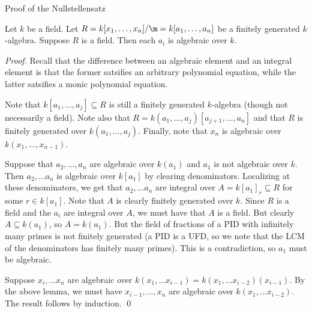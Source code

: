 Proof of the Nullstellensatz

\begin{theorem}
    Let $k$ be a field. Let $R=k[x_1, \dots, x_n]/\m = k[a_1, \dots, a_n]$ be a finitely
    generated $k$-algebra. Suppose $R$ is a
    field. Then each $a_i$ is algebraic over $k$.
\end{theorem}
\begin{proof}
    Recall that the difference between an algebraic element and an integral element
    is that the former satsifies an arbitrary polynomial equation, while the latter
    satsifies a monic polynomial equation.

    Note that $k[a_1, \dots, a_j] \subseteq R$ is still a finitely generated
    $k$-algebra (though not necessarily a field). Note also that
    $R=k(a_1, \dots, a_j)[a_{j+1}, \dots, a_n]$ and that $R$ is finitely generated
    over $k(a_1, \dots, a_j)$. Finally, note that $x_n$ is
    algebraic over $k(x_1, \dots, x_{n-1})$.

    Suppose that $a_2, \dots, a_n$ are algebraic over $k(a_1)$
    and $a_1$ is not algebraic over $k$. Then
    $a_2, \dots a_n$ is algebraic over $k[a_1]$ by clearing
    denominators. Localizing at these denominators, we get that
    $a_2,\dots a_n$ are integral over $A=k[a_1]_r \subseteq R$ for some
    $r \in k[a_1]$. Note that $A$ is clearly finitely
    generated over $k$. Since $R$ is a field
    and the $a_i$ are integral over $A$, we
    must have that $A$ is a field. But clearly
    $A \subseteq k(a_1)$, so $A=k(a_1)$. But the field of fractions
    of a PID with infinitely many primes is not finitely generated (a PID is a UFD,
    so we note that the LCM of the denominators has finitely many primes). This is
    a contradiction, so $a_1$ must be algebraic.

    Suppose $x_i, \dots x_n$ are algebraic over $k(x_1, \dots x_{i-1})=k(x_1, \dots
        x_{i-2})(x_{i-1})$. By
    the above lemma, we must have $x_{i-1}, \dots, x_n$ are algebraic over
    $k(x_1, \dots x_{i-2})$. The result follows by induction. \qed
\end{proof}